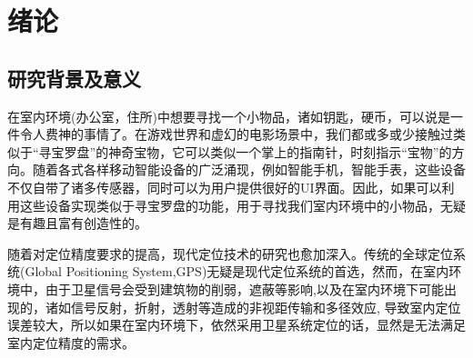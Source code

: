 \documentclass[winfonts]{njuthesis}
\begin{document}
%
%
%
%

\tableofcontents



\mainmatter

\chapter{绪论}\label{chapter_introduction}
	\section{研究背景及意义}
	
		在室内环境(办公室，住所)中想要寻找一个小物品，诸如钥匙，硬币，可以说是一件令人费神的事情了\cite{HyperEarAbstract}。在游戏世界和虚幻的电影场景中，我们都或多或少接触过类似于“寻宝罗盘”的神奇宝物，它可以类似一个掌上的指南针，时刻指示“宝物”的方向。随着各式各样移动智能设备的广泛涌现，例如智能手机，智能手表，这些设备不仅自带了诸多传感器，同时可以为用户提供很好的UI界面。因此，如果可以利用这些设备实现类似于寻宝罗盘的功能，用于寻找我们室内环境中的小物品，无疑是有趣且富有创造性的。
		
		随着对定位精度要求的提高，现代定位技术的研究也愈加深入。传统的全球定位系统(Global Positioning System,GPS)\cite{wikipedia_GPS}无疑是现代定位系统的首选，然而，在室内环境中，由于卫星信号会受到建筑物的削弱，遮蔽等影响,以及在室内环境下可能出现的，诸如信号反射，折射，透射等造成的非视距传输和多径效应, 导致室内定位误差较大，所以如果在室内环境下，依然采用卫星系统定位的话，显然是无法满足室内定位精度的需求。
		
\end{document}
